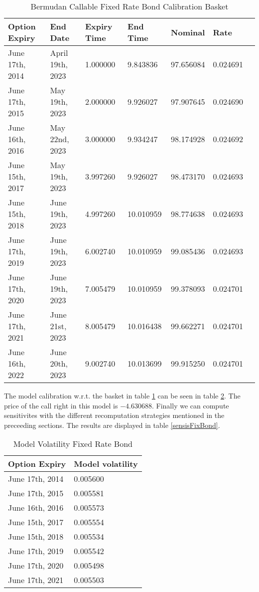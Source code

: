 \documentclass{amsart}
\theoremstyle{plain}
\numberwithin{equation}{section}
\begin{document}
\begin{table}[ht]
\caption{Bermudan Callable Fixed Rate Bond Calibration Basket}
\begin{tabular}{l | l | l | l | l | l | l}
Option Expiry & End Date & Expiry Time & End Time & Nominal & Rate \\ \hline
June 17th, 2014 & April 19th, 2023 & 1.000000 & 9.843836 & 97.656084 & 0.024691 \\
June 17th, 2015 & May 19th, 2023 & 2.000000 & 9.926027 & 97.907645 & 0.024690 \\
June 16th, 2016 & May 22nd, 2023 & 3.000000 & 9.934247 & 98.174928 & 0.024692 \\
June 15th, 2017 & May 19th, 2023 & 3.997260 & 9.926027 & 98.473170 & 0.024693 \\
June 15th, 2018 & June 19th, 2023 & 4.997260 & 10.010959 & 98.774638 & 0.024693 \\
June 17th, 2019 & June 19th, 2023 & 6.002740 & 10.010959 & 99.085436 & 0.024693 \\
June 17th, 2020 & June 19th, 2023 & 7.005479 & 10.010959 & 99.378093 & 0.024701 \\
June 17th, 2021 & June 21st, 2023 & 8.005479 & 10.016438 & 99.662271 & 0.024701 \\
June 16th, 2022 & June 20th, 2023 & 9.002740 & 10.013699 & 99.915250 & 0.024701
\end{tabular}
\label{bermudanCallableFixBond}
\end{table}

The model calibration w.r.t. the basket in table \ref{bermudanCallableFixBond} can be seen in table \ref{bermudanCallableFixBondModelCal}. The price of the call right in this model is $-4.630688$. Finally we can compute sensitivites with the different recomputation strategies mentioned in the preceeding sections. The results are displayed in table \ref{sensisFixBond}.

\begin{table}[ht]
\caption{Model Volatility Fixed Rate Bond}
\begin{tabular}{l | l }
Option Expiry & Model volatility \\ \hline
June 17th, 2014 & 0.005600 \\
June 17th, 2015 & 0.005581 \\
June 16th, 2016 & 0.005573 \\
June 15th, 2017 & 0.005554 \\
June 15th, 2018 & 0.005534 \\
June 17th, 2019 & 0.005542 \\
June 17th, 2020 & 0.005498 \\
June 17th, 2021 & 0.005503
\end{tabular}
\label{bermudanCallableFixBondModelCal}
\end{table}
\end{document}
